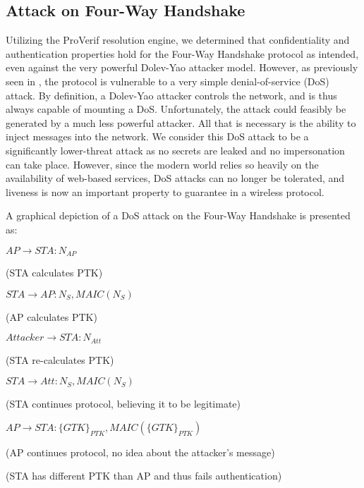 \documentclass[11pt, twocolumn]{article} %
\begin{document}
{\subsection{Attack on Four-Way Handshake}
Utilizing the ProVerif resolution engine, we determined that confidentiality and authentication properties hold for the Four-Way Handshake protocol as intended, even against the very powerful Dolev-Yao attacker model.  However, as previously seen in \cite{he04}, the protocol is vulnerable to a very simple denial-of-service (DoS) attack.  By definition, a Dolev-Yao attacker controls the network, and is thus always capable of mounting a DoS.  Unfortunately, the attack could feasibly be generated by a much less powerful attacker.  All that is necessary is the ability to inject messages into the network.   We consider this DoS attack to be a significantly lower-threat attack as no secrets are leaked and no impersonation can take place. However, since the modern world relies so heavily on the availability of web-based services, DoS attacks can no longer be tolerated, and liveness is now an important property to guarantee in a wireless protocol.

A graphical depiction of a DoS attack on the Four-Way Handshake is presented as:  

\begin{enumerate}[leftmargin=5mm]
{\small
\item $AP \rightarrow STA: N_{AP}$

{\tiny (STA calculates PTK)}

\item $STA \rightarrow AP: N_S, MAIC(N_S)$

{\tiny (AP calculates PTK) }

\item $Attacker \rightarrow STA: N_{Att}$

{\tiny (STA re-calculates PTK) }

\item $STA \rightarrow Att: N_S, MAIC(N_S)$

{\tiny (STA continues protocol, believing it to be legitimate)}

\item $AP \rightarrow STA: \{GTK\}_{PTK}, MAIC(\{GTK\}_{PTK})$

{\tiny (AP continues protocol, no idea about the attacker's message)}

{\tiny (STA has different PTK than AP and thus fails authentication)}

}
\end{enumerate}

}
\end{document}
